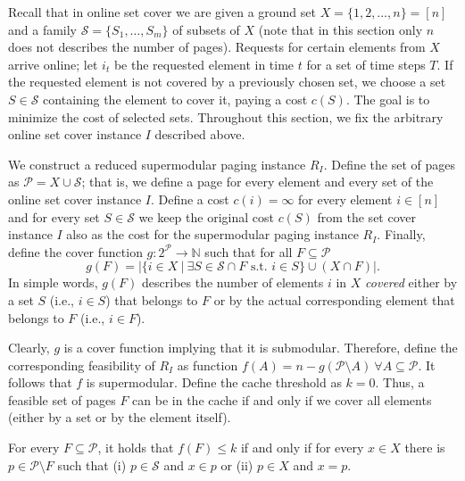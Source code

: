 \documentclass[11pt]{article}
\newcommand{\cP}{{\mathcal{P}}}
\newcommand{\cS}{{\mathcal{S}}}
\begin{document}
 Recall that in online set cover we are given  a ground set $X = \{1,2,\ldots, n\} = [n]$ and a family $\cS = \{S_1,\ldots, S_m\}$ of subsets of $X$ (note that in this section only $n$ does not describes the number of pages). Requests for certain elements from $X$ arrive online; let $i_t$ be the requested element in time $t$ for a set of time steps $T$. If the requested element is not covered by a previously chosen set, we choose a set $S \in \cS$ containing the element to cover it, paying a cost $c(S)$. The goal is to minimize the cost of selected sets. Throughout this section, we fix the arbitrary online set cover instance $I$ described above. 

We construct a reduced supermodular paging instance $R_I$. Define the set of pages as $\cP = X \cup \cS$; that is, we define a page for every element and every set of the online set cover instance $I$. Define a cost $c(i) = \infty$ for every element $i \in [n]$ and for every set $S \in \cS$ we keep the original cost $c(S)$ from the set cover instance $I$ also as the cost for the supermodular paging instance $R_I$. Finally, define the cover function $g: 2^{\cP} \rightarrow \mathbb{N}$ such that for all $F \subseteq \cP$ 
\begin{equation}
	\label{eq:g}
	g(F) = \left| \{i \in X~|~ \exists S \in \cS \cap F \text{ s.t. } i \in S\} \cup \left(X \cap F\right) \right|. 
\end{equation} In simple words, $g(F)$ describes the number of elements $i$ in $X$ {\em covered} either by a set $S$ (i.e., $i \in S$) that belongs to $F$ or by the actual corresponding element that belongs to $F$ (i.e., $i \in F$). %

 Clearly, $g$ is a cover function implying that it is submodular. Therefore, define the corresponding feasibility of $R_I$ as function $f(A) = n-g(\cP \setminus A)~\forall A \subseteq \cP$. It follows that $f$ is supermodular. Define the cache threshold as $k = 0$. Thus, a feasible set of pages $F$ can be in the cache if and only if we cover all elements (either by a set or by the element itself). 



\begin{obs}
	\label{obs:F}
	For every $F \subseteq \cP$, it holds that $f(F) \leq k$ if and only if for every $x \in X$ there is $p \in \cP \setminus F$ such that (i) $p \in \cS$ and $x \in p$ or (ii) $p \in X$ and $x = p$. 
\end{obs}
\end{document}
